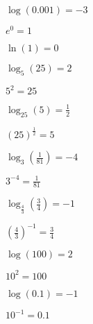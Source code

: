 \documentclass{ximera}
\begin{document}
\begin{question}
\begin{problem}
\begin{solution}
$\log(0.001) = -3$
\end{solution}
\end{problem}

\begin{problem}
$e^{0}  = 1$ 

\begin{solution}
    $\ln(1) = 0$
\end{solution}
\end{problem}

\begin{problem}
$\log_{5}(25) = 2$

\begin{solution}
    $5^{2} = 25$
\end{solution}
\end{problem}

\begin{problem}
$\log_{25} (5) = \frac{1}{2}$

\begin{solution}
$(25)^{\frac{1}{2}} = 5$
\end{solution}
\end{problem}

\begin{problem}
$\log_{3} \left(\frac{1}{81} \right) = -4$

\begin{solution}
    $3^{-4} = \frac{1}{81}$
\end{solution}
\end{problem}

\begin{problem}
$\log_{\frac{4}{3}} \left(\frac{3}{4} \right) = -1$ 

\begin{solution}
    $\left(\frac{4}{3} \right)^{-1} = \frac{3}{4}$
\end{solution}
\end{problem}

\begin{problem}
$\log(100) = 2$ 

\begin{solution}
$10^{2} = 100$
\end{solution}
\end{problem}

\begin{problem}
$\log (0.1) = -1$

\begin{solution}
    $10^{-1} = 0.1$
\end{solution}
\end{problem}


\end{question}
\end{document}
